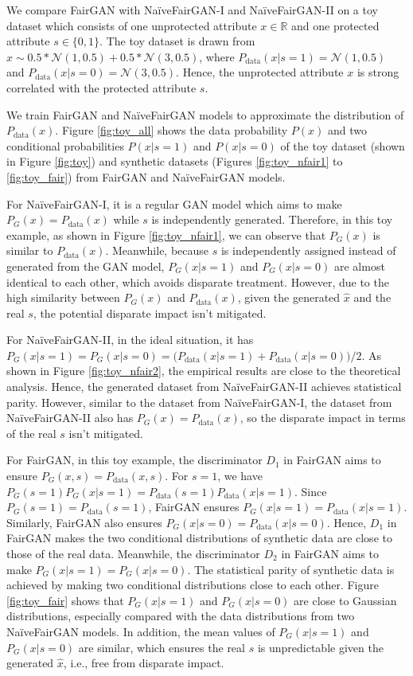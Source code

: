 \documentclass[sigconf]{acmart}
\theoremstyle{definition}
\begin{document}
We compare FairGAN with Na\"iveFairGAN-I and Na\"iveFairGAN-II on a toy dataset which consists of one unprotected attribute $x \in \mathbb{R}$ and one protected attribute $s \in \{0,1\}$. The toy dataset is drawn from $x \sim 0.5*\mathcal{N}(1,0.5)+0.5*\mathcal{N}(3,0.5)$, where $P_{\text{data}}(x|s=1)=\mathcal{N}(1,0.5)$ and $P_{\text{data}}(x|s=0)=\mathcal{N}(3,0.5)$. Hence, the unprotected attribute $x$ is strong correlated with the protected attribute $s$. 

We train FairGAN and Na\"iveFairGAN models to approximate the distribution of $P_{\text{data}}(x)$. Figure \ref{fig:toy_all} shows the data probability $P(x)$ and two conditional probabilities $P(x|s=1)$ and $P(x|s=0)$ of the toy dataset (shown in Figure \ref{fig:toy}) and synthetic datasets (Figures \ref{fig:toy_nfair1} to \ref{fig:toy_fair}) from FairGAN and Na\"iveFairGAN models.

For Na\"iveFairGAN-I, it is a regular GAN model which aims to make $P_G(x)=P_{\text{data}}(x)$ while $s$ is independently generated. Therefore, in this toy example, as shown in Figure \ref{fig:toy_nfair1}, we can observe that $P_G(x)$ is similar to $P_{\text{data}}(x)$. Meanwhile, because $s$ is independently assigned instead of generated from the GAN model,  $P_G(x|s=1)$ and $P_G(x|s=0)$ are almost identical to each other, which avoids disparate treatment. However, due to the high similarity between $P_G(x)$ and $P_{\text{data}}(x)$, given the generated $\hat{x}$ and the real  $s$, the potential disparate impact isn't mitigated. 

For Na\"iveFairGAN-II, in the ideal situation, it has $P_G(x|s=1)=P_G(x|s=0)= \big(P_{\text{data}}(x|s=1)+P_{\text{data}}(x|s=0)\big)/2$. As shown in Figure \ref{fig:toy_nfair2}, the empirical results are close to the theoretical analysis. Hence, the generated dataset from Na\"iveFairGAN-II achieves statistical parity. However, similar to the dataset from Na\"iveFairGAN-I, the dataset from Na\"iveFairGAN-II also has $P_G(x)=P_{\text{data}}(x)$, so the disparate impact in terms of the real $s$ isn't mitigated. 

For FairGAN, in this toy example, the discriminator $D_1$ in FairGAN aims to ensure $P_G(x, s)=P_{\text{data}}(x, s)$. For $s=1$, we have $P_G(s=1)P_G(x|s=1)=P_{\text{data}}(s=1)P_{\text{data}}(x|s=1)$. Since $P_G(s=1)=P_{\text{data}}(s=1)$, FairGAN ensures $P_G(x|s=1)=P_{\text{data}}(x|s=1)$. Similarly, FairGAN also ensures $P_G(x|s=0)=P_{\text{data}}(x|s=0)$. Hence,  $D_1$ in FairGAN makes the two conditional distributions of synthetic data are close to those of the real data. Meanwhile, the discriminator $D_2$ in FairGAN aims to make $P_G(x|s=1)=P_{G}(x|s=0)$. The statistical parity of synthetic data is achieved by making two conditional distributions close to each other. Figure \ref{fig:toy_fair} shows that $P_G(x|s=1)$ and $P_G(x|s=0)$ are close to Gaussian distributions, especially compared with the data distributions from two Na\"iveFairGAN models. In addition, the mean values of $P_G(x|s=1)$ and $P_G(x|s=0)$ are similar, which ensures the real $s$ is unpredictable given the generated  $\hat{x}$, i.e., free from disparate impact.
\end{document}
